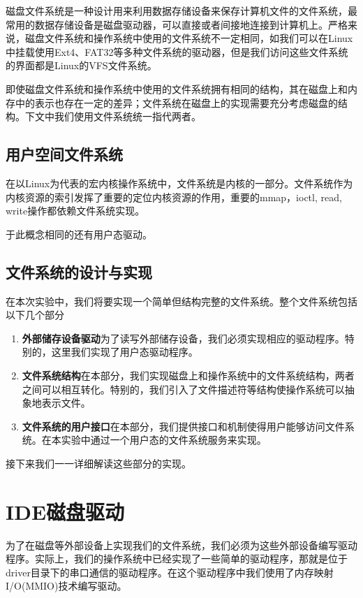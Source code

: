 磁盘文件系统是一种设计用来利用数据存储设备来保存计算机文件的文件系统，最常用的数据存储设备是磁盘驱动器，可以直接或者间接地连接到计算机上。严格来说，磁盘文件系统和操作系统中使用的文件系统不一定相同，如我们可以在Linux中挂载使用Ext4、FAT32等多种文件系统的驱动器，但是我们访问这些文件系统的界面都是Linux的VFS文件系统。

即使磁盘文件系统和操作系统中使用的文件系统拥有相同的结构，其在磁盘上和内存中的表示也存在一定的差异；文件系统在磁盘上的实现需要充分考虑磁盘的结构。下文中我们使用文件系统统一指代两者。

\subsection{用户空间文件系统}

在以Linux为代表的宏内核操作系统中，文件系统是内核的一部分。文件系统作为内核资源的索引发挥了重要的定位内核资源的作用，重要的mmap，ioctl, read, write操作都依赖文件系统实现。

于此概念相同的还有用户态驱动。



\subsection{文件系统的设计与实现}

在本次实验中，我们将要实现一个简单但结构完整的文件系统。整个文件系统包括以下几个部分

\begin{enumerate}
	\item \textbf{外部储存设备驱动}为了读写外部储存设备，我们必须实现相应的驱动程序。特别的，这里我们实现了用户态驱动程序。
	\item \textbf{文件系统结构}在本部分，我们实现磁盘上和操作系统中的文件系统结构，两者之间可以相互转化。特别的，我们引入了文件描述符等结构使操作系统可以抽象地表示文件。
	\item \textbf{文件系统的用户接口}在本部分，我们提供接口和机制使得用户能够访问文件系统。在本实验中通过一个用户态的文件系统服务来实现。
\end{enumerate}

接下来我们一一详细解读这些部分的实现。

\section{IDE磁盘驱动}

为了在磁盘等外部设备上实现我们的文件系统，我们必须为这些外部设备编写驱动程序。实际上，我们的操作系统中已经实现了一些简单的驱动程序，那就是位于driver目录下的串口通信的驱动程序。在这个驱动程序中我们使用了内存映射I/O(MMIO)技术编写驱动。

